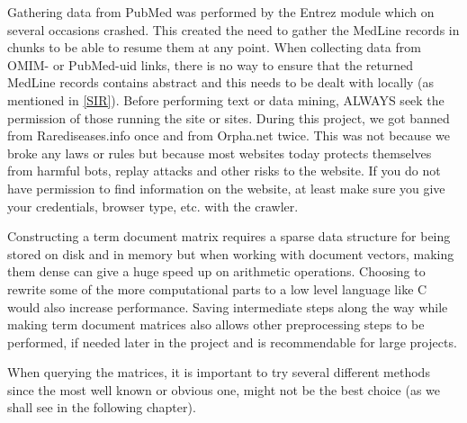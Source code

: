 Gathering data from PubMed was performed by the Entrez module which on
several occasions crashed. This created the need to gather the
MedLine records in chunks to be able to resume them at any point. When
collecting data from OMIM- or PubMed-uid links, there is no way to
ensure that the returned MedLine records contains abstract and this
needs to be dealt with locally (as mentioned in \ref{SIR}). Before
performing text or data mining, ALWAYS seek the permission of those
running the site or sites. During this project, we got banned from
Rarediseases.info once and from Orpha.net twice. This was not because
we broke any laws or rules but because most websites today protects
themselves from harmful bots, replay attacks and other risks to the
website. If you do not have permission to find information on the
website, at least make sure you give your credentials, browser type,
etc. with the crawler.

Constructing a term document matrix requires a sparse data structure
for being stored on disk and in memory but when working with document
vectors, making them dense can give a huge speed up on arithmetic
operations. Choosing to rewrite some of the more computational parts
to a low level language like C would also increase performance. Saving
intermediate steps along the way while making term document matrices
also allows other preprocessing steps to be performed, if needed later
in the project and is recommendable for large projects.

When querying the matrices, it is important to try several different
methods since the most well known or obvious one, might not be the
best choice (as we shall see in the following chapter).
